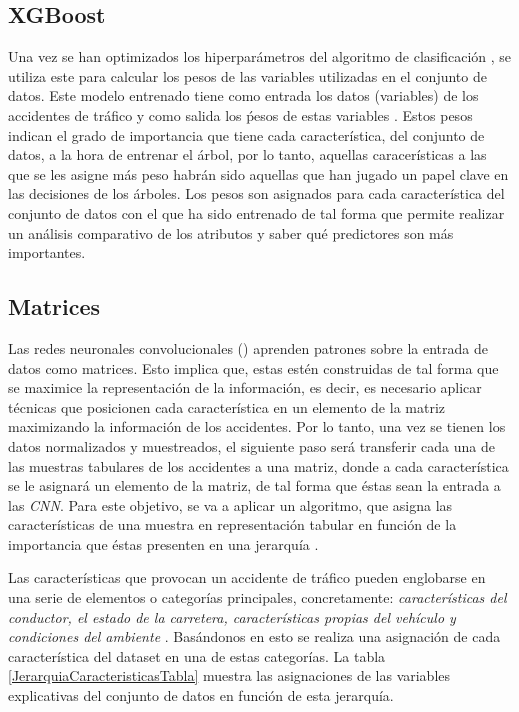     \subsection{XGBoost}


        Una vez se han optimizados los hiperparámetros del algoritmo de clasificación , se utiliza este para calcular los pesos de las variables utilizadas en el conjunto de datos. Este modelo entrenado tiene como entrada los datos (variables) de los accidentes de tráfico y como salida los ṕesos de estas variables \cite{XGBoostFeatureWeightsMeaning}. Estos pesos indican el grado de importancia que tiene cada característica, del conjunto de datos, a la hora de entrenar el árbol, por lo tanto, aquellas caracerísticas a las que se les asigne más peso habrán sido aquellas que han jugado un papel clave en las decisiones de los árboles. Los pesos son asignados para cada característica del conjunto de datos con el que ha sido entrenado  de tal forma que permite realizar un análisis comparativo de los atributos y saber qué predictores son más importantes.


    \subsection{Matrices}


        Las redes neuronales convolucionales () aprenden patrones sobre la entrada de datos como matrices. Esto implica que, estas estén construidas de tal forma que se maximice la representación de la información, es decir, es necesario aplicar técnicas que posicionen cada característica en un elemento de la matriz maximizando la información de los accidentes. Por lo tanto, una vez se tienen los datos normalizados y muestreados, el siguiente paso será transferir cada una de las muestras tabulares de los accidentes a una matriz, donde a cada característica se le asignará un elemento de la matriz, de tal forma que éstas sean la entrada a las \textit{CNN}. Para este objetivo, se va a aplicar un algoritmo, que asigna las características de una muestra en representación tabular en función de la importancia que éstas presenten en una jerarquía \cite{TASPCNN}.

        Las características que provocan un accidente de tráfico pueden englobarse en una serie de elementos o categorías principales, concretamente: \textit{características del conductor, el estado de la carretera, características propias del vehículo y condiciones del ambiente} \cite{JerarquiaImagenes}. Basándonos en esto se realiza una asignación de cada característica del dataset en una de estas categorías. La tabla \eqref{JerarquiaCaracteristicasTabla} muestra las asignaciones de las variables explicativas del conjunto de datos en función de esta jerarquía.


